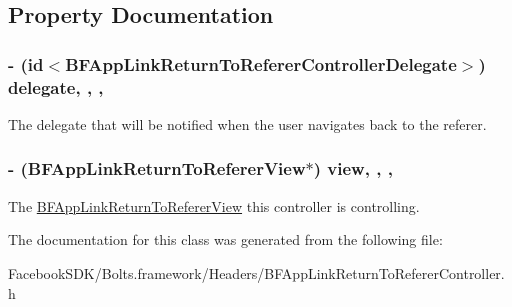 \subsection{Property Documentation}
\hypertarget{interface_b_f_app_link_return_to_referer_controller_a314cd7219fab9e64981a67e3bf99c6d6}{
\subsubsection[{delegate}]{\setlength{\rightskip}{0pt plus 5cm}-\/ (id$<${\bf B\-F\-App\-Link\-Return\-To\-Referer\-Controller\-Delegate}$>$) delegate\hspace{0.3cm}{\ttfamily [read]}, {\ttfamily [write]}, {\ttfamily [nonatomic]}, {\ttfamily [weak]}}}\label{interface_b_f_app_link_return_to_referer_controller_a314cd7219fab9e64981a67e3bf99c6d6}
The delegate that will be notified when the user navigates back to the referer. \hypertarget{interface_b_f_app_link_return_to_referer_controller_af28b223c0c9a782847fdf45e934a2009}{
\subsubsection[{view}]{\setlength{\rightskip}{0pt plus 5cm}-\/ ({\bf B\-F\-App\-Link\-Return\-To\-Referer\-View}$\ast$) view\hspace{0.3cm}{\ttfamily [read]}, {\ttfamily [write]}, {\ttfamily [nonatomic]}, {\ttfamily [strong]}}}\label{interface_b_f_app_link_return_to_referer_controller_af28b223c0c9a782847fdf45e934a2009}
The \hyperlink{interface_b_f_app_link_return_to_referer_view}{B\-F\-App\-Link\-Return\-To\-Referer\-View} this controller is controlling. 

The documentation for this class was generated from the following file\-:\begin{DoxyCompactItemize}
\item 
Facebook\-S\-D\-K/\-Bolts.\-framework/\-Headers/B\-F\-App\-Link\-Return\-To\-Referer\-Controller.\-h\end{DoxyCompactItemize}
